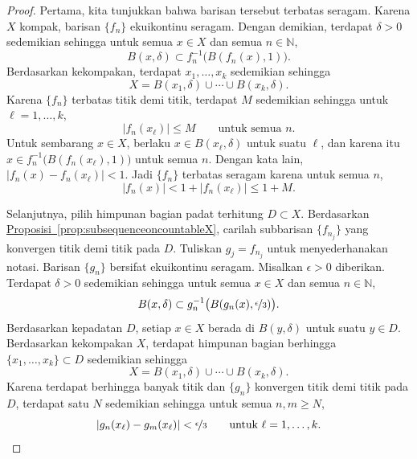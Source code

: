 \documentclass[12pt,openany]{book}
\newcommand{\sabs}[1]{\lvert {#1} \rvert}
\newcommand{\N}{{\mathbb{N}}}
\theoremstyle{plain}
\theoremstyle{remark}
\theoremstyle{definition}
\theoremstyle{exercise}
\theoremstyle{example}
\newcommand{\propref}[1]{\hyperref[#1]{Proposisi~\ref*{#1}}}
\begin{document}
\begin{proof}
Pertama, kita tunjukkan bahwa barisan tersebut terbatas seragam.
Karena $X$ kompak, barisan $\{ f_n \}$
ekuikontinu seragam.
Dengan demikian,
terdapat $\delta > 0$
sedemikian sehingga
untuk semua $x \in X$ dan semua $n \in \N$,
\begin{equation*}
B(x,\delta) \subset f_n^{-1}\bigl(B(f_n(x),1)\bigr) .
\end{equation*}
Berdasarkan kekompakan,
terdapat $x_1,\ldots,x_k$ sedemikian sehingga
\begin{equation*}
X = 
B(x_1,\delta)
\cup \cdots \cup
B(x_k,\delta) .
\end{equation*}
Karena $\{ f_n \}$ terbatas titik demi titik, terdapat $M$
sedemikian sehingga untuk $\ell=1,\ldots,k$,
\begin{equation*}
\sabs{f_n(x_\ell)} \leq M \qquad \text{untuk semua } n.
\end{equation*}
Untuk sembarang
$x \in X$, berlaku $x \in B(x_\ell,\delta)$ untuk suatu $\ell$, dan
karena itu
$x \in f_n^{-1}\bigl(B(f_n(x_\ell),1)\bigr)$
untuk semua $n$.
Dengan kata lain,
$\sabs{f_n(x)-f_n(x_\ell)} < 1$.  Jadi $\{ f_n \}$ terbatas seragam karena
untuk semua $n$,
\begin{equation*}
\sabs{f_n(x)} < 1+ \sabs{f_n(x_\ell)} \leq 1+M .
\end{equation*}

Selanjutnya, pilih himpunan bagian padat terhitung $D \subset X$.
Berdasarkan \propref{prop:subsequenceoncountableX}, carilah
subbarisan $\{ f_{n_j} \}$ yang konvergen titik demi titik pada $D$.
Tuliskan $g_j = f_{n_j}$ untuk menyederhanakan notasi.
Barisan $\{ g_n \}$ bersifat 
ekuikontinu seragam.
Misalkan $\epsilon > 0$ diberikan.  Terdapat $\delta > 0$
sedemikian sehingga untuk semua $x \in X$ dan semua $n \in \N$,
\begin{equation*}
B(x,\delta) \subset g_n^{-1}\bigl(B(g_n(x),\nicefrac{\epsilon}{3})\bigr).
\end{equation*}
Berdasarkan kepadatan $D$, setiap $x \in X$ berada di $B(y,\delta)$
untuk suatu $y \in D$.  Berdasarkan kekompakan $X$,
terdapat himpunan bagian berhingga $\{ x_1,\ldots,x_k \} \subset D$
sedemikian sehingga
\begin{equation*}
X = 
B(x_1,\delta)
\cup \cdots \cup
B(x_k,\delta) .
\end{equation*}
Karena terdapat berhingga banyak titik dan $\{ g_n \}$
konvergen titik demi titik pada $D$, terdapat satu $N$ sedemikian sehingga untuk 
semua $n,m \geq N$,
\begin{equation*}
\sabs{g_n(x_\ell)-g_m(x_\ell)} < \nicefrac{\epsilon}{3}
 \qquad \text{untuk } \ell=1,\ldots,k.
\end{equation*}


\end{proof}
\end{document}
